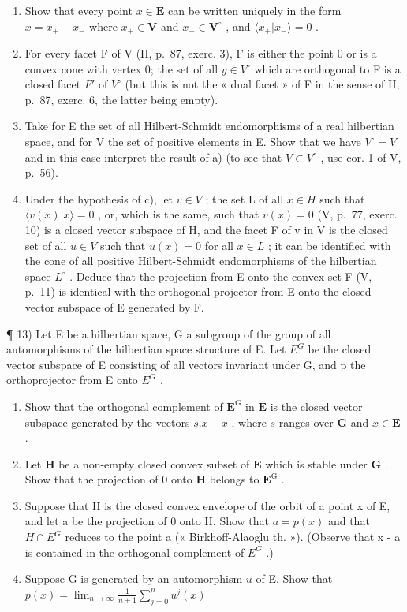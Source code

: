 \begin{enumerate}
\def\labelenumi{\alph{enumi})}
\item
  Show that every point \(x \in \mathbf{E}\) can be written uniquely in the form \(x = x_{+} - x_{-}\) where \(x_{+} \in \mathbf{V}\) and \(x_{-} \in \mathbf{V}^{\circ}\) , and \(\langle x_{+}|x_{-}\rangle = 0\) .
\item
  For every facet F of V (II, p.~87, exerc. 3), F is either the point 0 or is a convex cone with vertex 0; the set of all \(y \in V^{\circ}\) which are orthogonal to F is a closed facet \(F'\) of \(V^{\circ}\) (but this is not the « dual facet » of F in the sense of II, p.~87, exerc. 6, the latter being empty).
\item
  Take for E the set of all Hilbert-Schmidt endomorphisms of a real hilbertian space, and for V the set of positive elements in E. Show that we have \(V^{\circ} = V\) and in this case interpret the result of a) (to see that \(V \subset V^{\circ}\) , use cor. 1 of V, p.~56).
\item
  Under the hypothesis of c), let \(v \in V\) ; the set L of all \(x \in H\) such that \(\langle v(x)|x \rangle = 0\) , or, which is the same, such that \(v(x) = 0\) (V, p.~77, exerc. 10) is a closed vector subspace of H, and the facet F of v in V is the closed set of all \(u \in V\) such that \(u(x) = 0\) for all \(x \in L\) ; it can be identified with the cone of all positive Hilbert-Schmidt endomorphisms of the hilbertian space \(L^{\circ}\) . Deduce that the projection from E onto the convex set F (V, p.~11) is identical with the orthogonal projector from E onto the closed vector subspace of E generated by F.
\end{enumerate}

¶ 13) Let E be a hilbertian space, G a subgroup of the group of all automorphisms of the hilbertian space structure of E. Let \(E^{G}\) be the closed vector subspace of E consisting of all vectors invariant under G, and p the orthoprojector from E onto \(E^{G}\) .

\begin{enumerate}
\def\labelenumi{\alph{enumi})}
\item
  Show that the orthogonal complement of \(\mathbf{E}^{\mathrm{G}}\) in \(\mathbf{E}\) is the closed vector subspace generated by the vectors \(s.x - x\) , where \(s\) ranges over \(\mathbf{G}\) and \(x \in \mathbf{E}\) .
\item
  Let \(\mathbf{H}\) be a non-empty closed convex subset of \(\mathbf{E}\) which is stable under \(\mathbf{G}\) . Show that the projection of 0 onto \(\mathbf{H}\) belongs to \(\mathbf{E}^{\mathrm{G}}\) .
\item
  Suppose that H is the closed convex envelope of the orbit of a point x of E, and let a be the projection of 0 onto H. Show that \(a = p(x)\) and that \(H \cap E^{G}\) reduces to the point a (« Birkhoff-Alaoglu th. »). (Observe that x - a is contained in the orthogonal complement of \(E^{G}\) .)
\item
  Suppose G is generated by an automorphism \(u\) of E. Show that \(p(x) = \lim_{n\to \infty}\frac{1}{n + 1}\sum_{j = 0}^{n}u^{j}(x)\)
\end{enumerate}

